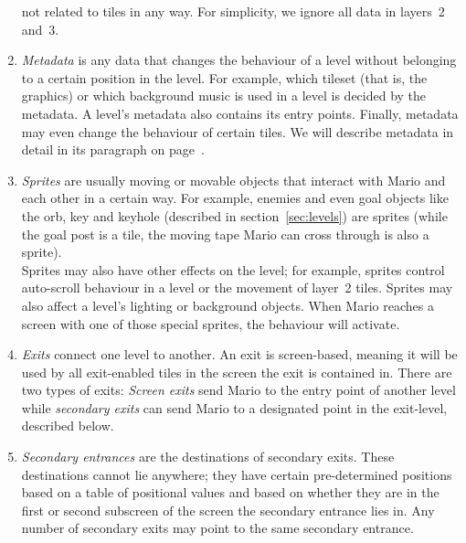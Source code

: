 \begin{enumerate}
  not related to tiles in any way. For simplicity, we ignore all data
  in layers~2 and~3.
\item \emph{Metadata} is any data that changes the behaviour of a
  level without belonging to a certain position in the level. For
  example, which tileset (that is, the graphics) or which background
  music is used in a level is decided by the metadata. A level's
  metadata also contains its entry points. Finally, metadata may even
  change the behaviour of certain tiles. We will describe metadata in
  detail in its paragraph on page~\pageref{par:metadata}.
\item \emph{Sprites} are usually moving or movable objects that
  interact with Mario and each other in a certain way. For example,
  enemies and even goal objects like the orb, key and keyhole
  (described in section~\ref{sec:levels}) are sprites (while the goal
  post is a tile, the moving tape Mario can cross through is also a
  sprite). \\
  Sprites may also have other effects on the level; for example,
  sprites control auto-scroll behaviour in a level or the movement of
  layer~2 tiles. Sprites may also affect a level's lighting or
  background objects. When Mario reaches a screen with one of those
  special sprites, the behaviour will activate.
\item \emph{Exits} connect one level to another. An exit is
  screen-based, meaning it will be used by all exit-enabled tiles in
  the screen the exit is contained in. There are two types of exits:
  \emph{Screen exits} send Mario to the entry point of another level
  while \emph{secondary exits} can send Mario to a designated point in
  the exit-level, described below.
\item \emph{Secondary entrances} are the destinations of secondary
  exits. These destinations cannot lie anywhere; they have certain
  pre-determined positions based on a table of positional values and
  based on whether they are in the first or second subscreen of the
  screen the secondary entrance lies in. Any number of secondary exits
  may point to the same secondary entrance.
\end{enumerate}

